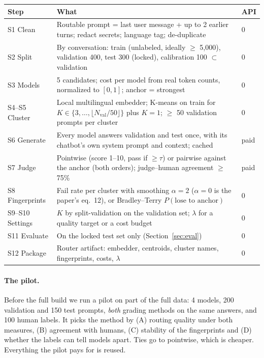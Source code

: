 \documentclass[11pt,a4paper]{article}
\begin{document}
\noindent\begin{tabularx}{\linewidth}{@{}P{28mm} L P{12mm}@{}}
\toprule
\textbf{Step} & \textbf{What} & \textbf{API} \\
\midrule
S1 Clean & Routable prompt = last user message + up to 2 earlier turns; redact secrets; language tag; de-duplicate & 0 \\
S2 Split & By conversation: train (unlabeled, ideally $\ge$ 5{,}000), validation 400, test 300 (locked), calibration 100 $\subset$ validation & 0 \\
S3 Models & 5 candidates; cost per model from real token counts, normalized to $[0,1]$; anchor = strongest & 0 \\
S4--S5 Cluster & Local multilingual embedder; K-means on train for $K\in\{3,\dots,\lfloor N_{\text{val}}/50\rfloor\}$ plus $K=1$; $\ge$ 50 validation prompts per cluster & 0 \\
S6 Generate & Every model answers validation and test once, with its chatbot's own system prompt and context; cached & paid \\
S7 Judge & Pointwise (score 1--10, pass if $\ge\tau$) or pairwise against the anchor (both orders); judge--human agreement $\ge$ 75\% & paid \\
S8 Fingerprints & Fail rate per cluster with smoothing $\alpha=2$ ($\alpha=0$ is the paper's eq.~12), or Bradley--Terry $P(\text{lose to anchor})$ & 0 \\
S9--S10 Settings & $K$ by split-validation on the validation set; $\lambda$ for a quality target or a cost budget & 0 \\
S11 Evaluate & On the locked test set only (Section~\ref{sec:eval}) & 0 \\
S12 Package & Router artifact: embedder, centroids, cluster names, fingerprints, costs, $\lambda$ & 0 \\
\bottomrule
\end{tabularx}

\medskip
{}

\paragraph{The pilot.} Before the full build we run a pilot on part of the full data: 4 models, 200
validation and 150 test prompts, \emph{both} grading methods on the same answers, and 100 human labels.
It picks the method by (A) routing quality under both measures, (B) agreement with humans,
(C) stability of the fingerprints and (D) whether the labels can tell models apart. Ties go to
pointwise, which is cheaper. Everything the pilot pays for is reused.
\end{document}
